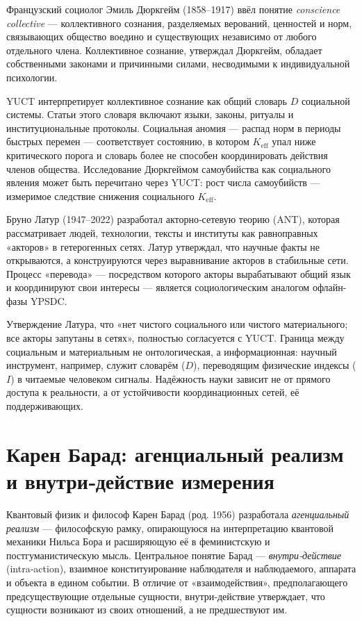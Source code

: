 \documentclass[12pt,a4paper]{article}
\begin{document}
	Французский социолог Эмиль Дюркгейм (1858–1917) ввёл понятие \emph{conscience collective} — коллективного сознания, разделяемых верований, ценностей и норм, связывающих общество воедино и существующих независимо от любого отдельного члена. Коллективное сознание, утверждал Дюркгейм, обладает собственными законами и причинными силами, несводимыми к индивидуальной психологии.
	
	YUCT интерпретирует коллективное сознание как общий словарь \(D\) социальной системы. Статьи этого словаря включают языки, законы, ритуалы и институциональные протоколы. Социальная аномия — распад норм в периоды быстрых перемен — соответствует состоянию, в котором \(K_{\mathrm{eff}}\) упал ниже критического порога и словарь более не способен координировать действия членов общества. Исследование Дюркгеймом самоубийства как социального явления может быть перечитано через YUCT: рост числа самоубийств — измеримое следствие снижения социального \(K_{\mathrm{eff}}\).
	
	Бруно Латур (1947–2022) разработал акторно‑сетевую теорию (ANT), которая рассматривает людей, технологии, тексты и институты как равноправных «акторов» в гетерогенных сетях. Латур утверждал, что научные факты не открываются, а конструируются через выравнивание акторов в стабильные сети. Процесс «перевода» — посредством которого акторы вырабатывают общий язык и координируют свои интересы — является социологическим аналогом офлайн-фазы YPSDC.
	
	Утверждение Латура, что «нет чистого социального или чистого материального; все акторы запутаны в сетях», полностью согласуется с YUCT. Граница между социальным и материальным не онтологическая, а информационная: научный инструмент, например, служит словарём (\(D\)), переводящим физические индексы (\(I\)) в читаемые человеком сигналы. Надёжность науки зависит не от прямого доступа к реальности, а от устойчивости координационных сетей, её поддерживающих.
	
	\section{Карен Барад: агенциальный реализм \\ и внутри‑действие измерения}
	
	Квантовый физик и философ Карен Барад (род. 1956) разработала \emph{агенциальный реализм} — философскую рамку, опирающуюся на интерпретацию квантовой механики Нильса Бора и расширяющую её в феминистскую и постгуманистическую мысль. Центральное понятие Барад — \emph{внутри‑действие} (intra‑action), взаимное конституирование наблюдателя и наблюдаемого, аппарата и объекта в едином событии. В отличие от «взаимодействия», предполагающего предсуществующие отдельные сущности, внутри‑действие утверждает, что сущности возникают из своих отношений, а не предшествуют им.
	
\end{document}

